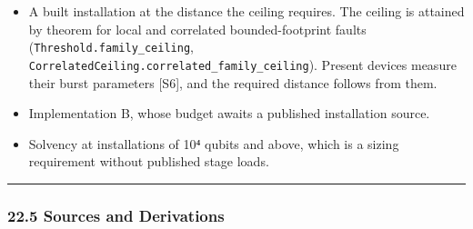 \documentclass[
]{article}
\providecommand{\tightlist}{%
  \setlength{\itemsep}{0pt}\setlength{\parskip}{0pt}}
\begin{document}
\begin{itemize}
\tightlist
\item
  A built installation at the distance the ceiling requires. The ceiling
  is attained by theorem for local and correlated bounded-footprint
  faults
  (\texttt{T\allowbreak{}h\allowbreak{}r\allowbreak{}e\allowbreak{}s\allowbreak{}h\allowbreak{}o\allowbreak{}l\allowbreak{}d\allowbreak{}.\allowbreak{}f\allowbreak{}a\allowbreak{}m\allowbreak{}i\allowbreak{}l\allowbreak{}y\allowbreak{}\_\allowbreak{}c\allowbreak{}e\allowbreak{}i\allowbreak{}l\allowbreak{}i\allowbreak{}n\allowbreak{}g},
  \texttt{C\allowbreak{}o\allowbreak{}r\allowbreak{}r\allowbreak{}e\allowbreak{}l\allowbreak{}a\allowbreak{}t\allowbreak{}e\allowbreak{}d\allowbreak{}C\allowbreak{}e\allowbreak{}i\allowbreak{}l\allowbreak{}i\allowbreak{}n\allowbreak{}g\allowbreak{}.\allowbreak{}c\allowbreak{}o\allowbreak{}r\allowbreak{}r\allowbreak{}e\allowbreak{}l\allowbreak{}a\allowbreak{}t\allowbreak{}e\allowbreak{}d\allowbreak{}\_\allowbreak{}f\allowbreak{}a\allowbreak{}m\allowbreak{}i\allowbreak{}l\allowbreak{}y\allowbreak{}\_\allowbreak{}c\allowbreak{}e\allowbreak{}i\allowbreak{}l\allowbreak{}i\allowbreak{}n\allowbreak{}g}).
  Present devices measure their burst parameters {[}S6{]}, and the
  required distance follows from them.
\item
  Implementation B, whose budget awaits a published installation source.
\item
  Solvency at installations of 10⁴ qubits and above, which is a sizing
  requirement without published stage loads.
\end{itemize}

\begin{center}\rule{0.5\linewidth}{0.5pt}\end{center}

\subsubsection{22.5 Sources and
Derivations}\label{sources-and-derivations}
\end{document}

